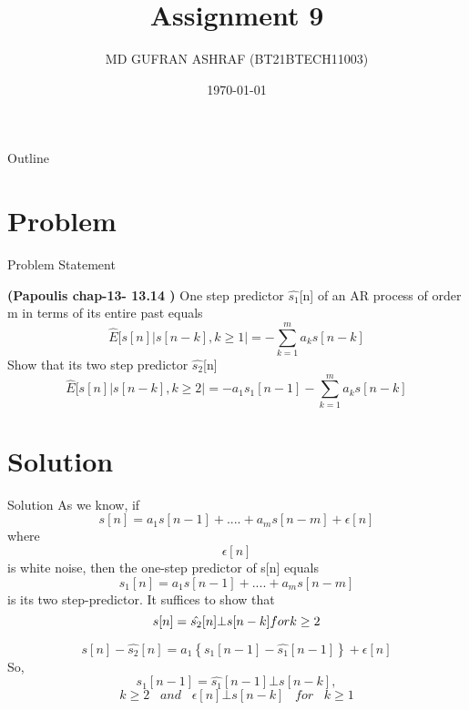 \documentclass{beamer}
\title{Assignment 9 }
\author{MD GUFRAN ASHRAF (BT21BTECH11003)}
\date{\today}
\begin{document}
\begin{frame}
    \titlepage 
\end{frame}

\begin{frame}{Outline}
    \tableofcontents
\end{frame}


\section{Problem}
\begin{frame}{Problem Statement}

\textbf{(Papoulis chap-13- 13.14 )}
One step predictor $\hat{s_{1}}$[n] of an AR process of order m in terms of its entire past equals
\begin{equation*}
    \hat{E}[s[n]|s[n-k], k \geq 1| = -\sum_{k=1}^{m}a_{k}s[n-k]
\end{equation*}
Show that its two step predictor  $\hat{s_{2}}$[n]
\begin{equation*}
    \hat{E}[s[n]|s[n-k], k \geq 2| = -a_{1}s_{1}[n-1] - \sum_{k=1}^{m}a_{k}s[n-k]
\end{equation*}

 
\end{frame}


\section{Solution}
\begin{frame}{Solution}
As we know, if 
\begin{equation}
    s[n] = a_{1}s[n-1] + ....+ a_{m}s[n-m] + \epsilon [n]
\end{equation}
where $$\epsilon [n]$$ is white noise, then the one-step predictor of s[n] equals
\begin{equation}
    s_{1}[n] = a_{1}s[n-1] + ....+ a_{m}s[n-m] 
\end{equation}
is its two step-predictor. It suffices to show that
\begin{equation*}
    s[n] = \hat{s_{2}}[n] \bot s[n-k]\\
    for k \geq 2
\end{equation*}
\end{frame} 

\begin{frame}
\begin{equation}
    s[n] - \hat{s_{2}}[n] = a_{1}\left\{s_{1}[n-1] - \hat{s_{1}}[n-1] \right\} + \epsilon [n]
\end{equation}
So,
\begin{equation*}
     s_{1}[n-1] = \hat{s_{1}}[n-1] \bot s[n-k],
\end{equation*}
\begin{equation*}
     k \geq 2 \;\;\; and \;\;\; \epsilon[n] \bot s[n-k] \;\;\; for \;\;\; k \geq 1
\end{equation*}
\end{frame}
\end{document}
